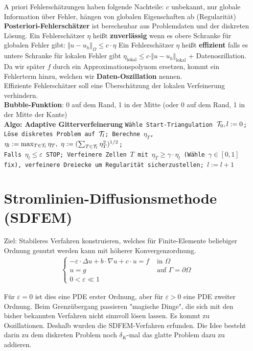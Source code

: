 \documentclass[12pt]{scrartcl}
\begin{document}
	A priori Fehlerschätzungen haben folgende Nachteile: $c$ unbekannt, nur globale Information über Fehler, hängen von globalen Eigenschaften ab (Regularität)\\
	\textbf{Posteriori-Fehlerschätzer} ist berechenbar aus Problemdaten und der diskreten Lösung.
	Ein Fehlerschätzer $\eta$ heißt \textbf{zuverlässig} wenn es obere Schranke für globalen Fehler gibt: $\Vert u-u_h\Vert_\Omega\leq c\cdot\eta$
	Ein Fehlerschätzer $\eta$ heißt \textbf{effizient} falls es untere Schranke für lokalen Fehler gibt $\eta_{\text{lokal}}\leq c\cdot\Vert u-u_h\Vert_{\text{lokal}}$ + Datenoszillation.
	Da wir später $f$ durch ein Approximationspolynom ersetzen, kommt ein Fehlerterm hinzu, welchen wir \textbf{Daten-Oszillation} nennen.\\
	Effiziente Fehlerschätzer soll eine Überschätzung der lokalen Verfeinerung verhindern.\\
	\textbf{Bubble-Funktion}: 0 auf dem Rand, 1 in der Mitte (oder 0 auf dem Rand, 1 in der Mitte der Kante)\\
	\textbf{Algo: Adaptive Gitterverfeinerung} \texttt{Wähle Start-Triangulation $\mathcal{T}_0,l:=0$;\\ Löse diskretes Problem auf $\mathcal{T}_l$; Berechne $\eta_T$, $\eta_l:=\max_{T\in\mathcal{T}_l}\eta_T,~\eta:=(\sum_{T\in\mathcal{T}_l}\eta_T^2)^{1/2}$;\\ Falls $\eta_l\leq\varepsilon$ STOP; Verfeinere Zellen $T$ mit $\eta_T\geq\gamma\cdot\eta_l$ (Wähle $\gamma\in[0,1]$ fix), verfeinere Dreiecke um Regularität sicherzustellen; $l:=l+1$}\\
	
		
	\section{Stromlinien-Diffusionsmethode (SDFEM)}
	
	Ziel: Stabileres Verfahren konstruieren, welches für Finite-Elemente beliebiger Ordnung genutzt werden kann mit höherer Konvergenzordnung.
	\begin{align*}
\left\lbrace
	\begin{array}{rl}
	-\varepsilon\cdot\Delta u+b\cdot \nabla u+c\cdot u=f&\text{ in }\Omega\\
	u=g&\text{ auf }\Gamma=\partial\Omega\\
	0<\varepsilon\ll 1&
	\end{array}
	\right.
\end{align*}

	Für $\varepsilon=0$ ist dies eine PDE erster Ordnung, aber für $\varepsilon>0$ eine PDE zweiter Ordnung.
	Beim Grenzübergang passieren "magische Dinge", die sich mit den bisher bekannten Verfahren nicht sinnvoll lösen lassen.
	Es kommt zu Oszillationen.
	Deshalb wurden die SDFEM-Verfahren erfunden.
	Die Idee besteht darin zu dem diskreten Problem noch $\delta_K$-mal das glatte Problem dazu zu addieren.
	
\end{document}
